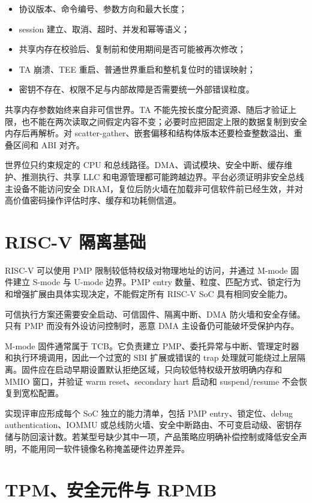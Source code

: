 \begin{itemize}
  \item 协议版本、命令编号、参数方向和最大长度；
  \item session 建立、取消、超时、并发和幂等语义；
  \item 共享内存在校验后、复制前和使用期间是否可能被再次修改；
  \item TA 崩溃、TEE 重启、普通世界重启和整机复位时的错误映射；
  \item 密钥不存在、权限不足与内部故障是否需要统一外部错误粒度。
\end{itemize}

共享内存参数始终来自非可信世界。TA 不能先按长度分配资源、随后才验证上限，也不能在两次读取之间假定内容不变；必要时应把固定上限的数据复制到安全内存后再解析。对 scatter-gather、嵌套偏移和结构体版本还要检查整数溢出、重叠区间和 ABI 对齐。

世界位只约束规定的 CPU 和总线路径。DMA、调试模块、安全中断、缓存维护、推测执行、共享 LLC 和电源管理都可能跨越边界。平台必须证明非安全总线主设备不能访问安全 DRAM，复位后防火墙在加载非可信软件前已经生效，并对高价值密码操作评估时序、缓存和功耗侧信道。

\section{RISC-V 隔离基础}

RISC-V 可以使用 PMP 限制较低特权级对物理地址的访问，并通过 M-mode 固件建立 S-mode 与 U-mode 边界\cite{riscvpri}。PMP entry 数量、粒度、匹配方式、锁定行为和增强扩展由具体实现决定，不能假定所有 RISC-V SoC 具有相同安全能力。

可信执行方案还需要安全启动、可信固件、隔离中断、DMA 防火墙和安全存储。只有 PMP 而没有外设访问控制时，恶意 DMA 主设备仍可能破坏受保护内存。

M-mode 固件通常属于 TCB。它负责建立 PMP、委托异常与中断、管理定时器和执行环境调用，因此一个过宽的 SBI 扩展或错误的 trap 处理就可能绕过上层隔离。固件应在启动早期设置默认拒绝区域，只向较低特权级开放明确内存和 MMIO 窗口，并验证 warm reset、secondary hart 启动和 suspend/resume 不会恢复到宽松配置。

实现评审应形成每个 SoC 独立的能力清单，包括 PMP entry、锁定位、debug authentication、IOMMU 或总线防火墙、安全中断路由、不可变启动级、密钥存储与防回滚计数。若某型号缺少其中一项，产品策略应明确补偿控制或降低安全声明，不能用同一软件镜像名称掩盖硬件边界差异。

\section{TPM、安全元件与 RPMB}

